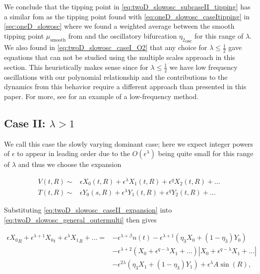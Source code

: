 We conclude that the tipping point in \eqref{eq:twoD_slowosc_subcaseII_tipping} has a similar fom as the tipping point found with \eqref{eq:oneD_slowosc_caseItipping} in \autoref{sec:oneD_slowosc} where we found a weighted average between the smooth tipping point $\mu_{\text{smooth}}$ from \cite{zhu2015tipping} and the oscillatory bifurcation ${\eta_2}_{\text{osc}}$ for this range of $\lambda$. We also found in \eqref{eq:twoD_slowosc_caseI_O2} that any choice for $\lambda\le\frac{1}{2}$ gave equations that can not be studied using the multiple scales approach in this section. This heuristically makes sense since for $\lambda\le \frac{1}{2}$ we have low frequency oscillations with our polynomial relationship and the contributions to the dynamics from this behavior require a different approach than presented in this paper. For more, see \cite{zhu2015tipping} for an example of a low-frequency method.

\subsection{Case II: $\lambda>1$}

We call this case the slowly varying dominant case; here we expect integer powers of $\epsilon$ to appear in leading order due to the $O(\epsilon^\lambda)$ being quite small for this range of $\lambda$ and thus we choose the expansion 

\begin{equation}\label{eq:twoD_slowosc_caseII_expansion}
\begin{aligned}
V(t,R) \sim& \epsilon X_0(t,R)+\epsilon^\lambda X_1(t,R)+\epsilon^q X_2(t,R)+\ldots\\
T(t,R) \sim& \epsilon Y_0(s,R) + \epsilon^\lambda Y_1(t,R) +\epsilon^q Y_2(t,R)+\ldots
\end{aligned}
\end{equation}

Substituting \eqref{eq:twoD_slowosc_caseII_expansion} into \eqref{eq:twoD_slowosc_general_outermulti} then gives

\begin{equation*}
\begin{aligned}
\epsilon {X_0}_R+\epsilon^{\lambda+1}{X_0}_t+\epsilon^\lambda {X_1}_R+\ldots={} & -\epsilon^{\lambda+\beta}n(t)-\epsilon^{\lambda+1} (\eta_3X_0+(1-\eta_3)Y_0) \\
&-\epsilon^{\lambda+2}(X_0+\epsilon^{q-\lambda} X_1+\ldots)|X_0+\epsilon^{q-\lambda} X_1+\ldots|\\
& - \epsilon^{2\lambda}(\eta_3X_1+(1-\eta_3)Y_1) + \epsilon^\lambda A\sin(R),
\end{aligned}
\end{equation*}

